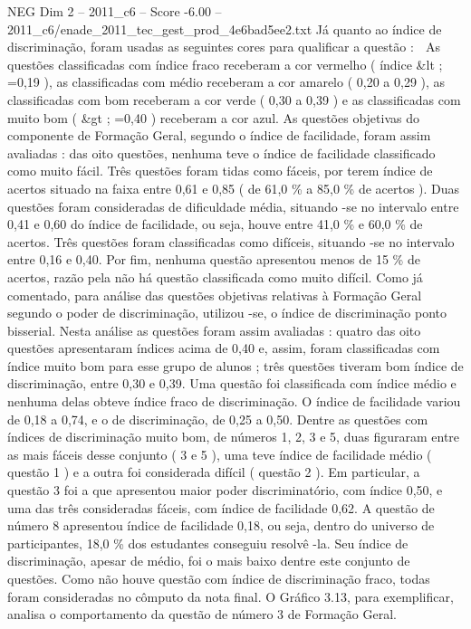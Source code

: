 \begin{textsample}{NEG Dim 2 – 2011\_c6 – Score -6.00 – 2011\_c6/enade\_2011\_tec\_gest\_prod\_4e6bad5ee2.txt}
Já quanto ao índice de discriminação, foram usadas as seguintes cores para qualificar a questão :  As questões classificadas com índice fraco receberam a cor vermelho ( índice \&lt ; =0,19 ), as classificadas com médio receberam a cor amarelo ( 0,20 a 0,29 ), as classificadas com bom receberam a cor verde ( 0,30 a 0,39 ) e as classificadas com muito bom ( \&gt ; =0,40 ) receberam a cor azul.
As questões objetivas do componente de Formação Geral, segundo o índice de facilidade, foram assim avaliadas : das oito questões, nenhuma teve o índice de facilidade classificado como muito fácil.
Três questões foram tidas como fáceis, por terem índice de acertos situado na faixa entre 0,61 e 0,85 ( de 61,0 \% a 85,0 \% de acertos ).
Duas questões foram consideradas de dificuldade média, situando -se no intervalo entre 0,41 e 0,60 do índice de facilidade, ou seja, houve entre 41,0 \% e 60,0 \% de acertos.
Três questões foram classificadas como difíceis, situando -se no intervalo entre 0,16 e 0,40.
Por fim, nenhuma questão apresentou menos de 15 \% de acertos, razão pela não há questão classificada como muito difícil.
Como já comentado, para análise das questões objetivas relativas à Formação Geral segundo o poder de discriminação, utilizou -se, o índice de discriminação ponto bisserial.
Nesta análise as questões foram assim avaliadas : quatro das oito questões apresentaram índices acima de 0,40 e, assim, foram classificadas com índice muito bom para esse grupo de alunos ; três questões tiveram bom índice de discriminação, entre 0,30 e 0,39.
Uma questão foi classificada com índice médio e nenhuma delas obteve índice fraco de discriminação.
O índice de facilidade variou de 0,18 a 0,74, e o de discriminação, de 0,25 a 0,50.
Dentre as questões com índices de discriminação muito bom, de números 1, 2, 3 e 5, duas figuraram entre as mais fáceis desse conjunto ( 3 e 5 ), uma teve índice de facilidade médio ( questão 1 ) e a outra foi considerada difícil ( questão 2 ).
Em particular, a questão 3 foi a que apresentou maior poder discriminatório, com índice 0,50, e uma das três consideradas fáceis, com índice de facilidade 0,62.
A questão de número 8 apresentou índice de facilidade 0,18, ou seja, dentro do universo de participantes, 18,0 \% dos estudantes conseguiu resolvê -la.
Seu índice de discriminação, apesar de médio, foi o mais baixo dentre este conjunto de questões.
Como não houve questão com índice de discriminação fraco, todas foram consideradas no cômputo da nota final.
O Gráfico 3.13, para exemplificar, analisa o comportamento da questão de número 3 de Formação Geral.

\end{textsample}
